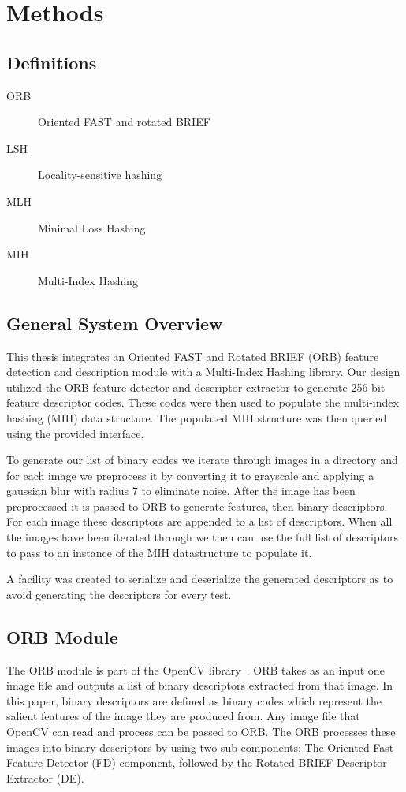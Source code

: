 \chapter{Methods}

\section{Definitions}
\begin{description}
 \item[ORB] Oriented FAST and rotated BRIEF
 \item[LSH] Locality-sensitive hashing
 \item[MLH] Minimal Loss Hashing
 \item[MIH] Multi-Index Hashing
\end{description}

\section{General System Overview}
This thesis integrates an Oriented FAST and Rotated BRIEF (ORB) feature detection and description module with a Multi-Index Hashing library. Our design utilized the ORB feature detector and descriptor extractor to generate 256 bit feature descriptor codes. These codes were then used to populate the multi-index hashing (MIH) data structure. The populated MIH structure was then queried using the provided interface.

To generate our list of binary codes we iterate through images in a directory and for each image we preprocess it by converting it to grayscale and applying a gaussian blur with radius 7 to eliminate noise. After the image has been preprocessed it is passed to ORB to generate features, then binary descriptors. For each image these descriptors are appended to a list of descriptors. When all the images have been iterated through we then can use the full list of descriptors to pass to an instance of the MIH datastructure to populate it.

A facility was created to serialize and deserialize the generated descriptors as to avoid generating the descriptors for every test.

\section{ORB Module}
The ORB module is part of the OpenCV library~\cite{rublee2011orb}. ORB takes as an input one image file and outputs a list of binary descriptors extracted from that image. In this paper, binary descriptors are defined as binary codes which represent the salient features of the image they are produced from. Any image file that OpenCV can read and process can be passed to ORB. The ORB processes these images into binary descriptors by using two sub-components: The Oriented Fast Feature Detector (FD) component, followed by the Rotated BRIEF Descriptor Extractor (DE).


